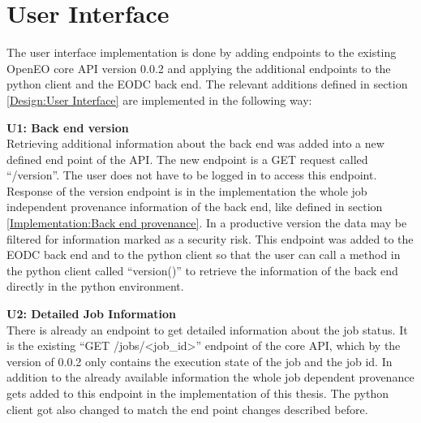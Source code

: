 \documentclass[draft,final]{vutinfth} %
\begin{document}
\section{User Interface}\label{Implementation:User Interface}
The user interface implementation is done by adding endpoints to the existing OpenEO core API version 0.0.2 and applying the additional endpoints to the python client and the EODC back end. The relevant additions defined in section \ref{Design:User Interface} are implemented in the following way:

\textbf{U1: Back end version} \\
Retrieving additional information about the back end was added into a new defined end point of the API. The new endpoint is a GET request called “/version”. The user does not have to be logged in to access this endpoint. Response of the version endpoint is in the implementation the whole job independent provenance information of the back end, like defined in section \ref{Implementation:Back end provenance}. In a productive version the data may be filtered for information marked as a security risk. This endpoint was added to the EODC back end and to the python client so that the user can call a method in the python client called “version()” to retrieve the information of the back end directly in the python environment. 

\textbf{U2: Detailed Job Information} \\
There is already an endpoint to get detailed information about the job status. It is the existing “GET /jobs/<job\_id>” endpoint of the core API, which by the version of 0.0.2 only contains the execution state of the job and the job id. In addition to the already available information the whole job dependent provenance gets added to this endpoint in the implementation of this thesis. The python client got also changed to match the end point changes described before.  
\end{document}
